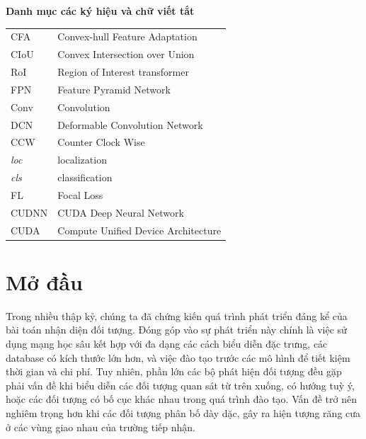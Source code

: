 \documentclass[12pt,a4paper,openany,oneside]{report}
\begin{document}



\newpage 
{} 

\listoffigures


\newpage 
{} 
\listoftables

	\newpage
{}

\begin{center}
	{\LARGE
		{\bf Danh mục các ký hiệu và chữ viết tắt}}
\end{center}
\vspace{1.25cm}
{\fontsize{13}{13}\selectfont
	\begin{tabular}{ll}
  CFA &  Convex-hull Feature Adaptation\\
  CIoU & Convex Intersection over Union\\
  RoI & Region of Interest transformer\\
  FPN & Feature Pyramid Network\\
  Conv & Convolution\\
  DCN & Deformable Convolution Network\\
  CCW & Counter Clock Wise\\
  \textit{loc} & localization\\
  \textit{cls} & classification\\
  FL & Focal Loss\\
  CUDNN & CUDA Deep Neural Network\\
  CUDA & Compute Unified Device Architecture
	\end{tabular}
}
\newpage
{} 
\pagestyle{fancy} 

\chapter*{Mở đầu}

Trong nhiều thập kỷ, chúng ta đã chứng kiến quá trình phát triển đáng kể của bài toán nhận diện đối tượng. Đóng góp vào sự phát triển này chính là việc sử dụng mạng học sâu kết hợp với đa dạng các cách biểu diễn đặc trưng, các database có kích thước lớn hơn, và việc đào tạo trước các mô hình để tiết kiệm thời gian và chi phí. Tuy nhiên, phần lớn các bộ phát hiện đối tượng đều gặp phải vấn đề khi biểu diễn các đối tượng quan sát từ trên xuống, có hướng tuỳ ý, hoặc các đối tượng có bố cục khác nhau trong quá trình đào tạo. Vấn đề trở nên nghiêm trọng hơn khi các đối tượng phân bố dày dặc, gây ra hiện tượng răng cưa ở các vùng giao nhau của trường tiếp nhận.
\end{document}
